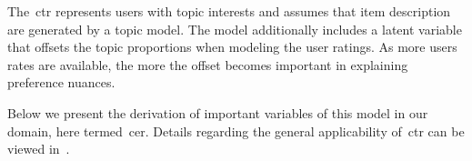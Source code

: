 The~\gls{ctr} represents users with topic interests and assumes that item description are generated by a topic model. The model additionally includes a latent variable that offsets the topic proportions when modeling the user ratings. As more users rates are available, the more the offset becomes important in explaining preference nuances.

Below we present the derivation of important variables of this model in our domain, here termed~\gls{cer}. Details regarding the general applicability of~\gls{ctr} can be viewed in~\cite{wang_collaborative_2011}.

